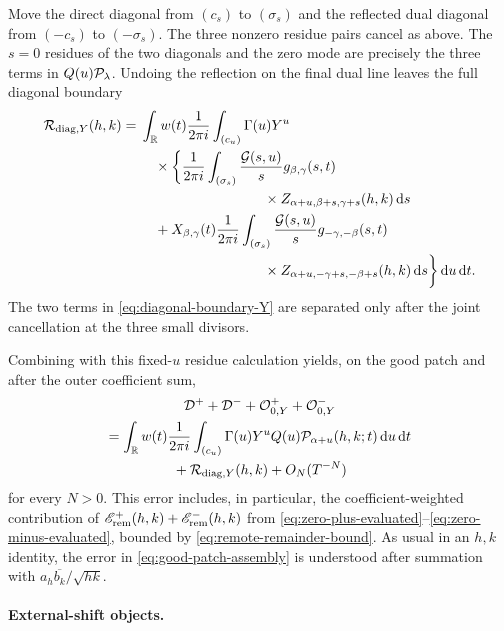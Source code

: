 Move the direct diagonal from $(c_s)$ to $(\sigma_s)$ and the reflected dual
diagonal from $(-c_s)$ to $(-\sigma_s)$.  The three nonzero residue pairs
cancel as above.  The $s=0$ residues of the two diagonals and the zero mode
are precisely the three terms in $Q(u)\mathcal P_\lambda$.  Undoing the reflection
on the final dual line leaves the full diagonal boundary
\begin{align}
 \mathcal R_{\mathrm{diag},Y}(h,k)
 ={}&\int_{\R}w(t)\frac{1}{2\pi i}\int_{(c_u)}\Gamma(u)Y^u\notag\\
 &\quad\times\bigg\{
 \frac{1}{2\pi i}\int_{(\sigma_s)}\frac{\mathcal G(s,u)}s
 g_{\beta,\gamma}(s,t)\notag\\
 &\hspace{31mm}\times
 Z_{\alpha+u,\beta+s,\gamma+s}(h,k)\dd s\notag\\
 &\quad+X_{\beta,\gamma}(t)
 \frac{1}{2\pi i}\int_{(\sigma_s)}\frac{\mathcal G(s,u)}s
 g_{-\gamma,-\beta}(s,t)\notag\\
 &\hspace{31mm}\times
 Z_{\alpha+u,-\gamma+s,-\beta+s}(h,k)\dd s
 \bigg\}\dd u\dd t.
 \label{eq:diagonal-boundary-Y}
\end{align}
The two terms in \eqref{eq:diagonal-boundary-Y} are separated only after the
joint cancellation at the three small divisors.

Combining  with this fixed-$u$ residue
calculation yields, on the good patch and after the outer coefficient sum,
\begin{multline}
 \mathcal D^++\mathcal D^-+\mathcal O_{0,Y}^+
 +\mathcal O_{0,Y}^-\\
 =\int_{\mathbb R}w(t)\frac{1}{2\pi i}\int_{(c_u)}
 \Gamma(u)Y^uQ(u)\mathcal P_{\alpha+u}(h,k;t)\,\mathrm d u\,\mathrm d t\\
 {}+\mathcal R_{\mathrm{diag},Y}(h,k)+O_N(T^{-N})
 \label{eq:good-patch-assembly}
\end{multline}
for every $N>0$.  This error includes, in particular, the
coefficient-weighted contribution of
$\mathscr E_{\rm rem}^+(h,k)+\mathscr E_{\rm rem}^-(h,k)$ from
\eqref{eq:zero-plus-evaluated}--\eqref{eq:zero-minus-evaluated}, bounded by
\eqref{eq:remote-remainder-bound}.  As usual in an $h,k$ identity, the error in
\eqref{eq:good-patch-assembly} is understood after summation with
$a_h\overline{b_k}/\sqrt{hk}$.

\paragraph{External-shift objects.}

